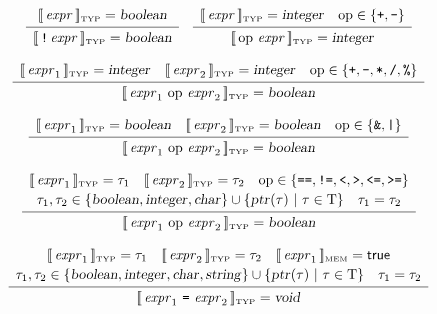 \documentclass[10pt]{article}
\begin{document}
$$ \begin{array}{c}
   \typattr{\nont{expr}} = \type{boolean}
   \\[2pt]\hline\\[-10pt]
   \typattr{\term{!}\,\nont{expr}} = \type{boolean}
   \end{array}
  \quad
   \begin{array}{c}
   \typattr{\nont{expr}} = \type{integer} \quad
   \mbox{op}\in\{\term{+},\term{-}\}
   \\[2pt]\hline\\[-10pt]
   \typattr{\mbox{op}\ \nont{expr}} = \type{integer}
   \end{array} $$

$$ \begin{array}{c}
   [\![\,\mbox{\textit{expr}}_1\,]\!]_{\mbox{\tiny TYP}} = \mbox{\textsl{integer}} \quad
   [\![\,\mbox{\textit{expr}}_2\,]\!]_{\mbox{\tiny TYP}} = \mbox{\textsl{integer}} \quad
   \mbox{op}\in\{\mbox{\texttt{+}},\mbox{\texttt{-}},\mbox{\texttt{*}},\mbox{\texttt{/}},\mbox{\texttt{\%}}\}
   \\[2pt]\hline\\[-10pt]
   [\![\,\mbox{\textit{expr}}_1\ \mbox{op}\ \mbox{\textit{expr}}_2\,]\!]_{\mbox{\tiny TYP}} = \mbox{\textsl{boolean}}
   \end{array} $$
 
$$ \begin{array}{c}
   [\![\,\mbox{\textit{expr}}_1\,]\!]_{\mbox{\tiny TYP}} = \mbox{\textsl{boolean}} \quad
   [\![\,\mbox{\textit{expr}}_2\,]\!]_{\mbox{\tiny TYP}} = \mbox{\textsl{boolean}} \quad
   \mbox{op}\in\{\mbox{\texttt{\&}},\mbox{\texttt{|}}\}
   \\[2pt]\hline\\[-10pt]
   [\![\,\mbox{\textit{expr}}_1\ \mbox{op}\ \mbox{\textit{expr}}_2\,]\!]_{\mbox{\tiny TYP}} = \mbox{\textsl{boolean}}
   \end{array} $$
  
$$ \begin{array}{c}
   [\![\,\mbox{\textit{expr}}_1\,]\!]_{\mbox{\tiny TYP}} = \tau_1 \quad
   [\![\,\mbox{\textit{expr}}_2\,]\!]_{\mbox{\tiny TYP}} = \tau_2 \quad
   \mbox{op}\in\{\mbox{\texttt{==}},\mbox{\texttt{!=}},\mbox{\texttt{<}},\mbox{\texttt{>}},\mbox{\texttt{<=}},\mbox{\texttt{>=}}\}\\[2pt]
   \tau_1,\tau_2 \in \{\mbox{\textsl{boolean}},\mbox{\textsl{integer}},\mbox{\textsl{char}}\} \cup \{\mbox{\textsl{ptr}}(\tau)\ | \ \tau \in \mbox{T} \} \quad \tau_1 = \tau_2
   \\[2pt]\hline\\[-10pt]
   [\![\,\mbox{\textit{expr}}_1\ \mbox{op}\ \mbox{\textit{expr}}_2\,]\!]_{\mbox{\tiny TYP}} = \mbox{\textsl{boolean}}
   \end{array} $$

$$ \begin{array}{c}
   \typattr{\nont{expr}_1} = \tau_1 \quad
   \typattr{\nont{expr}_2} = \tau_2 \quad
   \memattr{\nont{expr}_1} = \mbox{\textsf{true}} \\[2pt]
   \tau_1,\tau_2 \in \{\type{boolean},\type{integer},\type{char},\type{string}\} \cup \{\type{ptr}(\tau)\ | \ \tau \in \mbox{T} \} \quad \tau_1 = \tau_2
   \\[2pt]\hline\\[-10pt]
   \typattr{\nont{expr}_1\ \term{=}\ \nont{expr}_2} = \type{void}
   \end{array} $$
\end{document}
